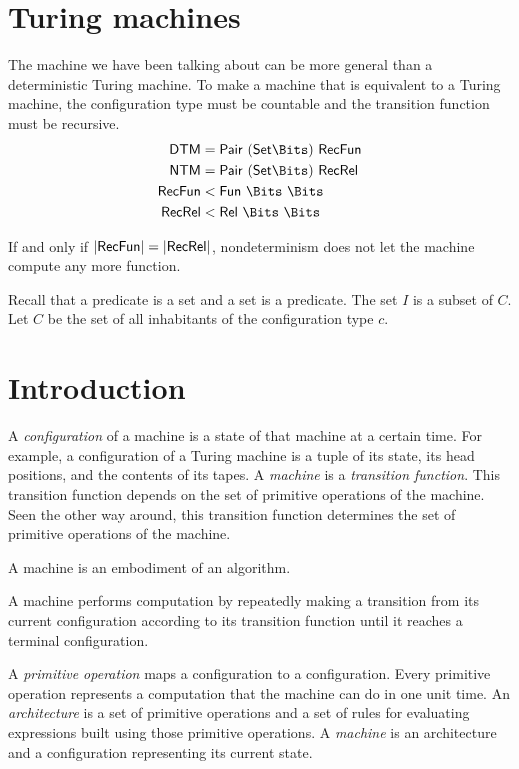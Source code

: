 \section{Turing machines}

The machine we have been talking about
can be more general than a deterministic Turing machine.
To make a machine that is equivalent to a Turing machine,
the configuration type must be countable
and the transition function must be recursive.
\begin{align*}
    \DTM &= \Pair{(\Set{\Bits})}{\RecFun}
    \\
    \NTM &= \Pair{(\Set{\Bits})}{\RecRel}
    \\
    \RecFun &< \Fun{\Bits}{\Bits}
    \\
    \RecRel &< \Relab{\Bits}{\Bits}
\end{align*}

If and only if $|\mathsf{RecFun}| = |\mathsf{RecRel}|$,
nondeterminism does not let the machine compute any more function.

Recall that a predicate is a set and a set is a predicate.
The set $I$ is a subset of $C$.
Let $C$ be the set of all inhabitants of the configuration type $c$.

\section{Introduction}

A \emph{configuration} of a machine is a state of that machine at a certain time.
For example, a configuration of a Turing machine is a tuple of its state,
its head positions, and the contents of its tapes.
A \emph{machine} is a \emph{transition function}.
This transition function depends on the set of primitive operations of the machine.
Seen the other way around, this transition function
determines the set of primitive operations of the machine.

A machine is an embodiment of an algorithm.

A machine performs computation by repeatedly
making a transition from its current configuration
according to its transition function
until it reaches a terminal configuration.

A \emph{primitive operation} maps a configuration to a configuration.
Every primitive operation represents a computation that the machine can do in one unit time.
An \emph{architecture} is a set of primitive operations
and a set of rules for evaluating expressions built using those primitive operations.
A \emph{machine} is an architecture and a configuration representing its current state.

